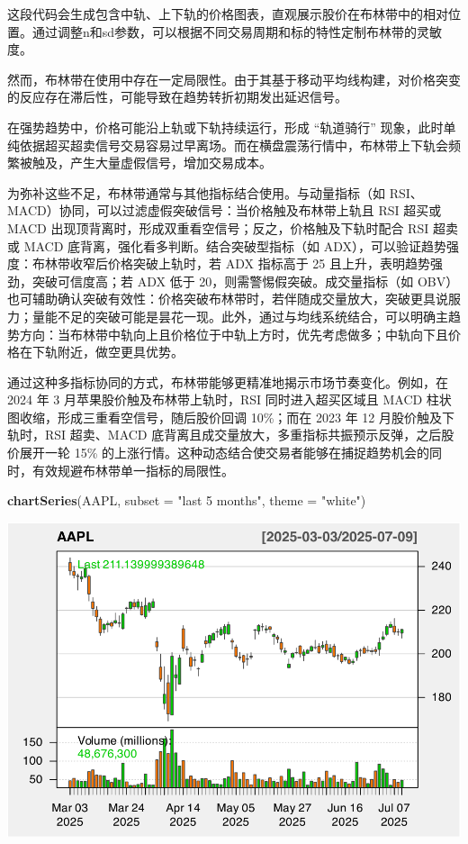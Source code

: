 \documentclass[]{ctexbook}
\newenvironment{Shaded}{\begin{snugshade}}{\end{snugshade}}
\newcommand{\AttributeTok}[1]{\textcolor[rgb]{0.13,0.29,0.53}{#1}}
\newcommand{\FunctionTok}[1]{\textcolor[rgb]{0.13,0.29,0.53}{\textbf{#1}}}
\newcommand{\NormalTok}[1]{#1}
\newcommand{\StringTok}[1]{\textcolor[rgb]{0.31,0.60,0.02}{#1}}
\begin{document}
这段代码会生成包含中轨、上下轨的价格图表，直观展示股价在布林带中的相对位置。通过调整n和sd参数，可以根据不同交易周期和标的特性定制布林带的灵敏度。

然而，布林带在使用中存在一定局限性。由于其基于移动平均线构建，对价格突变的反应存在滞后性，可能导致在趋势转折初期发出延迟信号。

在强势趋势中，价格可能沿上轨或下轨持续运行，形成 ``轨道骑行'' 现象，此时单纯依据超买超卖信号交易容易过早离场。而在横盘震荡行情中，布林带上下轨会频繁被触及，产生大量虚假信号，增加交易成本。

为弥补这些不足，布林带通常与其他指标结合使用。与动量指标（如 RSI、MACD）协同，可以过滤虚假突破信号：当价格触及布林带上轨且 RSI 超买或 MACD 出现顶背离时，形成双重看空信号；反之，价格触及下轨时配合 RSI 超卖或 MACD 底背离，强化看多判断。结合突破型指标（如 ADX），可以验证趋势强度：布林带收窄后价格突破上轨时，若 ADX 指标高于 25 且上升，表明趋势强劲，突破可信度高；若 ADX 低于 20，则需警惕假突破。成交量指标（如 OBV）也可辅助确认突破有效性：价格突破布林带时，若伴随成交量放大，突破更具说服力；量能不足的突破可能是昙花一现。此外，通过与均线系统结合，可以明确主趋势方向：当布林带中轨向上且价格位于中轨上方时，优先考虑做多；中轨向下且价格在下轨附近，做空更具优势。

通过这种多指标协同的方式，布林带能够更精准地揭示市场节奏变化。例如，在 2024 年 3 月苹果股价触及布林带上轨时，RSI 同时进入超买区域且 MACD 柱状图收缩，形成三重看空信号，随后股价回调 10\%；而在 2023 年 12 月股价触及下轨时，RSI 超卖、MACD 底背离且成交量放大，多重指标共振预示反弹，之后股价展开一轮 15\% 的上涨行情。这种动态结合使交易者能够在捕捉趋势机会的同时，有效规避布林带单一指标的局限性。

\begin{Shaded}
\begin{Highlighting}[]
\FunctionTok{chartSeries}\NormalTok{(AAPL, }\AttributeTok{subset =} \StringTok{"last 5 months"}\NormalTok{, }\AttributeTok{theme =} \StringTok{"white"}\NormalTok{)  }
\end{Highlighting}
\end{Shaded}

\includegraphics[width=0.9\linewidth]{quantmod_files/figure-latex/bb_2-1}
\end{document}
